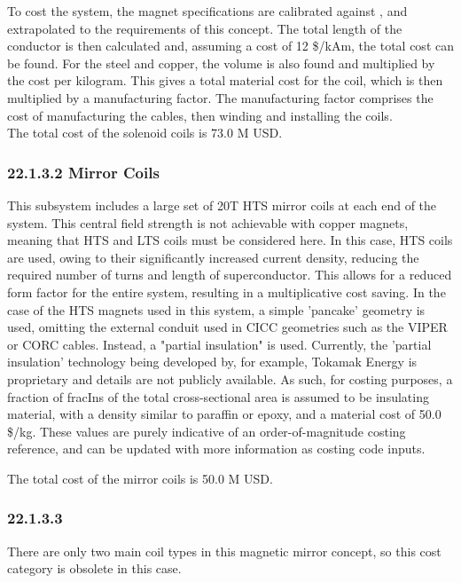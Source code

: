 To cost the system, the magnet specifications are calibrated against \cite{Menard2016}, and extrapolated to the requirements of this concept. The total length of the conductor is then calculated and, assuming a cost of 12 \$/kAm, the total cost can be found. For the steel and copper, the volume is also found and multiplied by the cost per kilogram. This gives a total material cost for the coil, which is then multiplied by a manufacturing factor. The manufacturing factor comprises the cost of manufacturing the cables, then winding and installing the coils. \\

The total cost of the solenoid coils is 73.0 M USD.


\subsubsection*{22.1.3.2 Mirror Coils}

This subsystem includes a large set of 20T HTS mirror coils at each end of the system. This central field strength is not achievable with copper magnets, meaning that HTS and LTS coils must be considered here. In this case, HTS coils are used, owing to their significantly increased current density, reducing the required number of turns and length of superconductor. This allows for a reduced form factor for the entire system, resulting in a multiplicative cost saving. In the case of the HTS magnets used in this system, a simple 'pancake' geometry is used, omitting the external conduit used in CICC geometries such as the VIPER or CORC cables. Instead, a "partial insulation" is used. Currently, the 'partial insulation' technology being developed by, for example, Tokamak Energy is proprietary and details are not publicly available. As such, for costing purposes, a fraction of fracIns of the total cross-sectional area is assumed to be insulating material, with a density similar to paraffin or epoxy, and a material cost of 50.0 \$/kg. These values are purely indicative of an order-of-magnitude costing reference, and can be updated with more information as costing code inputs.

The total cost of the mirror coils is 50.0 M USD. \\


\subsubsection*{22.1.3.3}

There are only two main coil types in this magnetic mirror concept, so this cost category is obsolete in this case.



